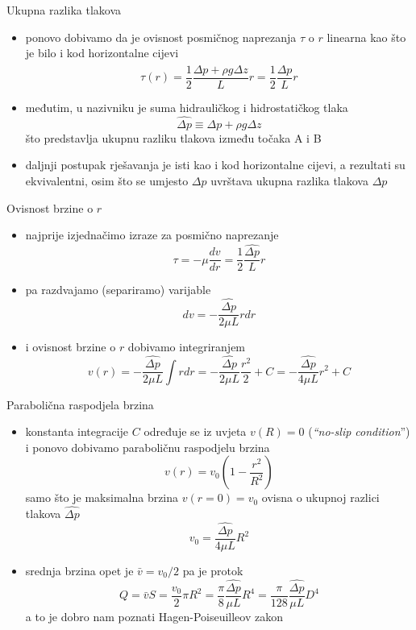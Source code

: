 \documentclass{beamer}
\begin{document}
\begin{frame}{Ukupna razlika tlakova}

\begin{itemize}
\item ponovo dobivamo da je ovisnost posmičnog naprezanja $\tau$ o $r$
linearna kao što je bilo i kod horizontalne cijevi
\[
\tau(r)=\frac{1}{2}\frac{\Delta p+\rho g\Delta z}{L}r=\frac{1}{2}\frac{\widehat{\Delta p}}{L}r
\]
\item međutim, u nazivniku je suma hidrauličkog i hidrostatičkog tlaka 
\[
\widehat{\Delta p}\equiv\Delta p+\rho g\Delta z
\]
 što predstavlja ukupnu razliku tlakova između točaka A i B
\item daljnji postupak rješavanja je isti kao i kod horizontalne cijevi,
a rezultati su ekvivalentni, osim što se umjesto $\Delta p$ uvrštava
ukupna razlika tlakova $\widehat{\Delta p}$
\end{itemize}
\end{frame}

\begin{frame}{Ovisnost brzine o $r$}

\begin{itemize}
\item najprije izjednačimo izraze za posmično naprezanje
\[
\tau=-\mu\frac{dv}{dr}=\frac{1}{2}\frac{\widehat{\Delta p}}{L}r
\]
\item pa razdvajamo (separiramo) varijable
\[
dv=-\frac{\widehat{\Delta p}}{2\mu L}rdr
\]
\item i ovisnost brzine o $r$ dobivamo integriranjem
\[
v(r)=-\frac{\widehat{\Delta p}}{2\mu L}\int rdr=-\frac{\widehat{\Delta p}}{2\mu L}\frac{r^{2}}{2}+C=-\frac{\widehat{\Delta p}}{4\mu L}r^{2}+C
\]
\end{itemize}
\end{frame}

\begin{frame}{Parabolična raspodjela brzina}

\begin{itemize}
\item konstanta integracije $C$ određuje se iz uvjeta $v(R)=0$ (\emph{``no-slip
condition}'') i ponovo dobivamo paraboličnu raspodjelu brzina
\[
v(r)=v_{0}\left(1-\frac{r^{2}}{R^{2}}\right)
\]
samo što je maksimalna brzina $v(r=0)=v_{0}$ ovisna o ukupnoj razlici
tlakova $\widehat{\Delta p}$
\[
v_{0}=\frac{\widehat{\Delta p}}{4\mu L}R^{2}
\]
\item srednja brzina opet je $\bar{v}=v_{0}/2$ pa je protok
\[
Q=\bar{v}S=\frac{v_{0}}{2}\pi R^{2}=\frac{\pi}{8}\frac{\widehat{\Delta p}}{\mu L}R^{4}=\frac{\pi}{128}\frac{\widehat{\Delta p}}{\mu L}D^{4}
\]
a to je dobro nam poznati \alert{Hagen-Poiseuilleov zakon}
\end{itemize}
\end{frame}
\end{document}
